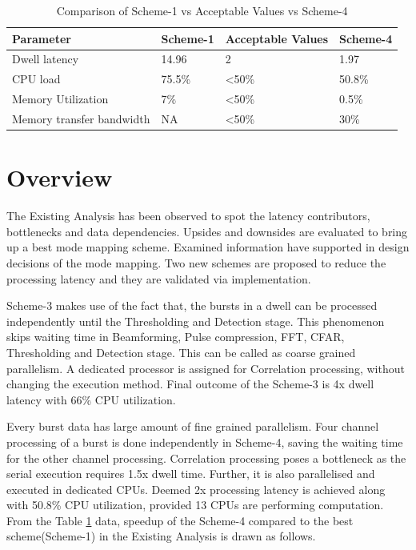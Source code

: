 \begin{table}[h!]
	\centering
	\begin{tabular}{|l|l|l|l|} 
	 \hline
	 \textbf{Parameter} & \textbf{Scheme-1} & \textbf{Acceptable Values} & \textbf{Scheme-4}\\
	 \hline
	 Dwell latency &  14.96 & 2 & 1.97 \\ \hline
	 CPU load & 75.5\% & \textless 50\% & 50.8\% \\ \hline
	 Memory Utilization & 7\% & \textless 50\%  & 0.5\% \\ \hline
	 Memory transfer bandwidth & NA & \textless 50\% & 30\%  \\ \hline
	\end{tabular}
	\caption{Comparison of Scheme-1 vs Acceptable Values vs Scheme-4}
	\label{tbl:mm:scheme5_comparison}
\end{table}

\section{Overview}
The Existing Analysis has been observed to spot the latency contributors, bottlenecks and data dependencies. Upsides and downsides are evaluated to bring up a best mode mapping scheme. Examined information have supported in design decisions of the mode mapping. Two new schemes are proposed to reduce the processing latency and they are validated via implementation. \vspace*{0.2cm}

Scheme-3 makes use of the fact that, the bursts in a dwell can be processed independently until the Thresholding and Detection stage. This phenomenon skips waiting time in Beamforming, Pulse compression, FFT, CFAR, Thresholding and Detection stage. This can be called as coarse grained parallelism. A dedicated processor is assigned for Correlation processing, without changing the execution method. Final outcome of the Scheme-3 is 4x dwell latency with 66\% CPU utilization. \vspace*{0.2cm}

Every burst data has large amount of fine grained parallelism. Four channel processing of a burst is done independently in Scheme-4, saving the waiting time for the other channel processing.  Correlation processing poses a bottleneck as the serial execution requires 1.5x dwell time. Further, it is also parallelised and executed in dedicated CPUs. Deemed 2x processing latency is achieved along with 50.8\% CPU utilization, provided 13 CPUs are performing computation. From the Table \ref{tbl:mm:scheme5_comparison} data, speedup of the Scheme-4 compared to the best scheme(Scheme-1) in the Existing Analysis is drawn as follows. \\

